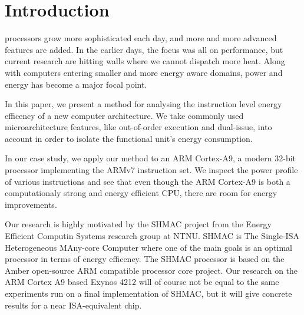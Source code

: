 \section{Introduction}

 processors grow more sophisticated each day, and more
and more advanced features are added. In the earlier days, the focus was all on
performance, but current research are hitting walls where we cannot dispatch more heat.
Along with computers entering smaller and more energy aware domains, power and
energy has become a major focal point\cite{patterson}\cite{hennessy}.

In this paper, we present a method for analysing the instruction level energy
efficency of a new computer architecture. We take commonly used
microarchitecture features, like out-of-order execution and dual-issue, into
account in order to isolate the functional unit's energy consumption.

In our case study, we apply our method to an ARM Cortex-A9, a modern 32-bit
processor implementing the ARMv7 instruction set. We inspect the power profile
of various instructions and see that even though the ARM Cortex-A9 is both a
computationaly strong and energy efficient CPU, there are room for energy
improvements.

Our research is highly motivated by the SHMAC project from the Energy Efficient
Computin Systems research group at NTNU. SHMAC is The Single-ISA Heterogeneous
MAny-core Computer where one of the main goals is an optimal processor in terms
of energy efficency. The SHMAC processor is based on the Amber open-source ARM
compatible processor core project. Our research on the ARM Cortex A9
based Exynos 4212 will of course not be equal to the same experiments run on
a final implementation of SHMAC, but it will give concrete results for a near
ISA-equivalent chip.


